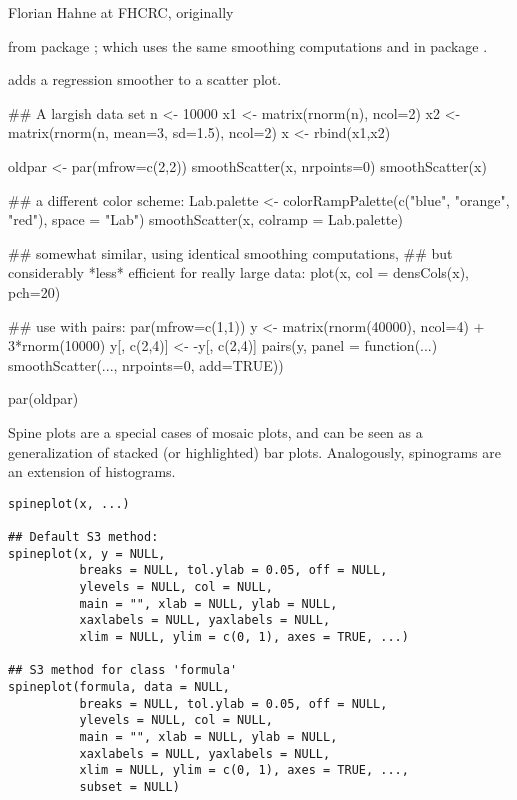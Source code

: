 %
\begin{Author}\relax
Florian Hahne at FHCRC, originally
\end{Author}
%
\begin{SeeAlso}\relax
{} from package ;
 which uses the same smoothing computations and
 in package .

 adds a 
regression smoother to a scatter plot.
\end{SeeAlso}
%
\begin{Examples}
\begin{ExampleCode}
  ## A largish data set
  n <- 10000
  x1  <- matrix(rnorm(n), ncol=2)
  x2  <- matrix(rnorm(n, mean=3, sd=1.5), ncol=2)
  x   <- rbind(x1,x2)

  oldpar <- par(mfrow=c(2,2))
  smoothScatter(x, nrpoints=0)
  smoothScatter(x)

  ## a different color scheme:
  Lab.palette <-
      colorRampPalette(c("blue", "orange", "red"), space = "Lab")
  smoothScatter(x, colramp = Lab.palette)

  ## somewhat similar, using identical smoothing computations,
  ## but considerably *less* efficient for really large data:
  plot(x, col = densCols(x), pch=20)

  ## use with pairs:
  par(mfrow=c(1,1))
  y <- matrix(rnorm(40000), ncol=4) + 3*rnorm(10000)
  y[, c(2,4)] <-  -y[, c(2,4)]
  pairs(y,
        panel = function(...) smoothScatter(..., nrpoints=0, add=TRUE))

  par(oldpar)
\end{ExampleCode}
\end{Examples}
%
\begin{Description}\relax
Spine plots are a special cases of mosaic plots, and can be seen as
a generalization of stacked (or highlighted) bar plots. Analogously,
spinograms are an extension of histograms.
\end{Description}
%
\begin{Usage}
\begin{verbatim}
spineplot(x, ...)

## Default S3 method:
spineplot(x, y = NULL,
          breaks = NULL, tol.ylab = 0.05, off = NULL,
          ylevels = NULL, col = NULL,
          main = "", xlab = NULL, ylab = NULL,
          xaxlabels = NULL, yaxlabels = NULL,
          xlim = NULL, ylim = c(0, 1), axes = TRUE, ...)

## S3 method for class 'formula'
spineplot(formula, data = NULL,
          breaks = NULL, tol.ylab = 0.05, off = NULL,
          ylevels = NULL, col = NULL,
          main = "", xlab = NULL, ylab = NULL,
          xaxlabels = NULL, yaxlabels = NULL,
          xlim = NULL, ylim = c(0, 1), axes = TRUE, ...,
          subset = NULL)
\end{verbatim}
\end{Usage}
